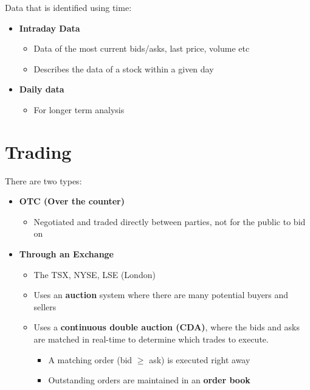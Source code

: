 \documentclass[
  oneside]{book}
\providecommand{\tightlist}{%
  \setlength{\itemsep}{0pt}\setlength{\parskip}{0pt}}
\begin{document}
Data that is identified using time:

\begin{itemize}
\tightlist
\item
  \textbf{Intraday Data}

  \begin{itemize}
  \tightlist
  \item
    Data of the most current bids/asks, last price, volume etc
  \item
    Describes the data of a stock within a given day
  \end{itemize}
\item
  \textbf{Daily data}

  \begin{itemize}
  \tightlist
  \item
    For longer term analysis
  \end{itemize}
\end{itemize}

\hypertarget{trading}{%
\section{Trading}\label{trading}}

There are two types:

\begin{itemize}
\tightlist
\item
  \textbf{OTC (Over the counter)}

  \begin{itemize}
  \tightlist
  \item
    Negotiated and traded directly between parties, not for the public to bid on
  \end{itemize}
\item
  \textbf{Through an Exchange}

  \begin{itemize}
  \tightlist
  \item
    The TSX, NYSE, LSE (London)
  \item
    Uses an \textbf{auction} system where there are many potential buyers and sellers
  \item
    Uses a \textbf{continuous double auction (CDA)}, where the bids and asks are matched in real-time to determine which trades to execute.

    \begin{itemize}
    \tightlist
    \item
      A matching order (bid \(\geq\) ask) is executed right away
    \item
      Outstanding orders are maintained in an \textbf{order book}
    \end{itemize}
  \end{itemize}
\end{itemize}
\end{document}
